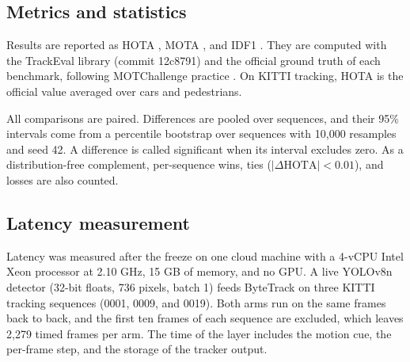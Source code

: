 \subsection{Metrics and statistics}\label{sec:metrics}
Results are reported as HOTA \cite{luiten2021hota}, MOTA
\cite{bernardin2008clear}, and IDF1 \cite{ristani2016idf1}. They are computed
with the TrackEval library (commit 12c8791) and the official ground truth of
each benchmark, following MOTChallenge practice
\cite{dendorfer2021motchallenge}. On KITTI tracking, HOTA is the official
value averaged over cars and pedestrians.

All comparisons are paired. Differences are pooled over sequences, and their
95\% intervals come from a percentile bootstrap over sequences
\cite{efron1993bootstrap} with 10,000 resamples and seed 42. A difference is
called significant when its interval excludes zero. As a distribution-free
complement, per-sequence wins, ties ($|\Delta\mathrm{HOTA}|<0.01$), and losses
are also counted.

\subsection{Latency measurement}\label{sec:latency-setup}
Latency was measured after the freeze on one cloud machine with a 4-vCPU
Intel Xeon processor at 2.10 GHz, 15 GB of memory, and no GPU. A live YOLOv8n
detector (32-bit floats, 736 pixels, batch 1) feeds ByteTrack on three KITTI
tracking sequences (0001, 0009, and 0019). Both arms run on the same frames
back to back, and the first ten frames of each sequence are excluded, which
leaves 2,279 timed frames per arm. The time of the layer includes the motion
cue, the per-frame step, and the storage of the tracker output.
